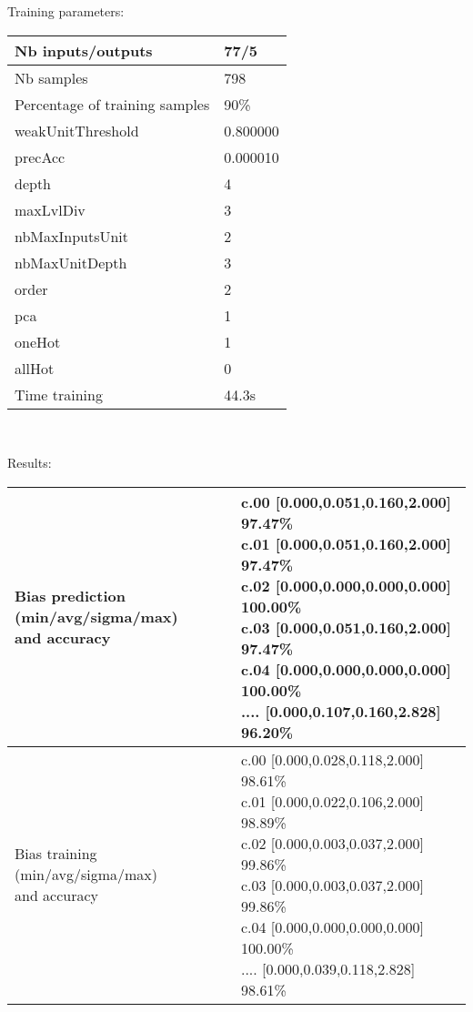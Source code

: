 Training parameters:\\
\begin{center}
\begin{tabular}{|l|l|}
\hline
Nb inputs/outputs&77/5\\
\hline
Nb samples&798\\
\hline
Percentage of training samples&90\%\\
\hline
weakUnitThreshold&0.800000\\
\hline
precAcc&0.000010\\
\hline
depth&4\\
\hline
maxLvlDiv&3\\
\hline
nbMaxInputsUnit&2\\
\hline
nbMaxUnitDepth&3\\
\hline
order&2\\
\hline
pca&1\\
\hline
oneHot&1\\
\hline
allHot&0\\
\hline
Time training&44.3s\\
\hline
\end{tabular}\\
\end{center}\newline
Results:
\begin{center}
\begin{tabular}{|l|l|}
\hline
\makecell{Bias prediction (min/avg/sigma/max)\\and accuracy}&\makecell{c.00 [0.000,0.051,0.160,2.000] 97.47\%\\
c.01 [0.000,0.051,0.160,2.000] 97.47\%\\
c.02 [0.000,0.000,0.000,0.000] 100.00\%\\
c.03 [0.000,0.051,0.160,2.000] 97.47\%\\
c.04 [0.000,0.000,0.000,0.000] 100.00\%\\
.... [0.000,0.107,0.160,2.828] 96.20\%\\
}\\

\hline
\makecell{Bias training (min/avg/sigma/max)\\and accuracy}&\makecell{c.00 [0.000,0.028,0.118,2.000] 98.61\%\\
c.01 [0.000,0.022,0.106,2.000] 98.89\%\\
c.02 [0.000,0.003,0.037,2.000] 99.86\%\\
c.03 [0.000,0.003,0.037,2.000] 99.86\%\\
c.04 [0.000,0.000,0.000,0.000] 100.00\%\\
.... [0.000,0.039,0.118,2.828] 98.61\%\\
}\\
\hline
\end{tabular}\
\end{center}
